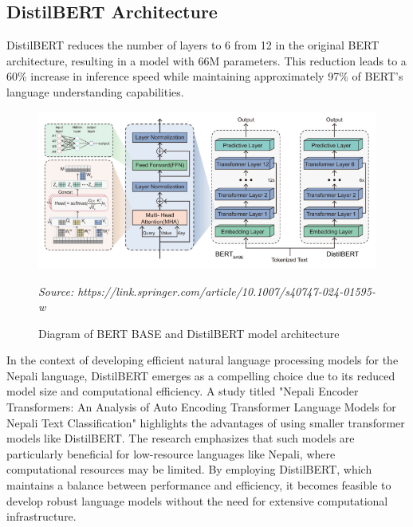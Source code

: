 \subsection{DistilBERT Architecture}
DistilBERT reduces the number of layers to 6 from 12 in the original BERT architecture, resulting in a model with 66M parameters. This reduction leads to a 60\% increase in inference speed while maintaining approximately 97\% of BERT's language understanding capabilities.\\
\begin{figure}
\centering
\includegraphics[scale=0.5]{images/distil.png}
\caption{Diagram of BERT BASE and DistilBERT model architecture}
\textit{Source: https://link.springer.com/article/10.1007/s40747-024-01595-w}
\end{figure}
In the context of developing efficient natural language processing models for the Nepali language, DistilBERT emerges as a compelling choice due to its reduced model size and computational efficiency. A study titled "Nepali Encoder Transformers: An Analysis of Auto Encoding Transformer Language Models for Nepali Text Classification" highlights the advantages of using smaller transformer models like DistilBERT. The research emphasizes that such models are particularly beneficial for low-resource languages like Nepali, where computational resources may be limited. By employing DistilBERT, which maintains a balance between performance and efficiency, it becomes feasible to develop robust language models without the need for extensive computational infrastructure.
